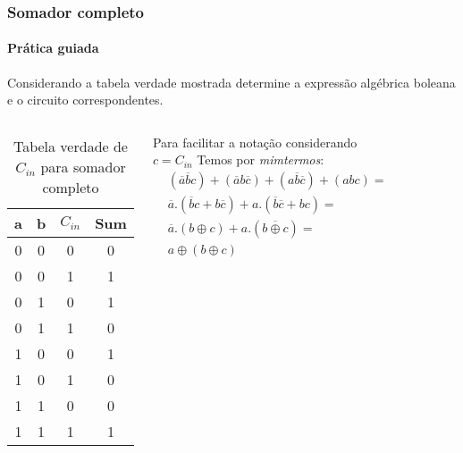 \begin{frame}
	\frametitle{Somador completo}
	\framesubtitle{\textbf{Prática guiada}}
	\par Considerando a tabela verdade mostrada determine a expressão algébrica boleana e o circuito correspondentes.
	\begin{columns}
			\begin{table}[h!]
				\centering
				\begin{tabular}{|c|c|c|c|}
					\hline
					a & b & $C_{in}$ & Sum \\
					\hline
					0 & 0 & 0 & 0 \\
					0 & 0 & 1 & 1 \\
					0 & 1 & 0 & 1 \\
					0 & 1 & 1 & 0 \\
					1 & 0 & 0 & 1 \\
					1 & 0 & 1 & 0 \\
					1 & 1 & 0 & 0 \\
					1 & 1 & 1 & 1 \\
					\hline
				\end{tabular}
				\caption{Tabela verdade de $C_{in}$ para somador completo}
				\label{tab:full_adder2}
			\end{table}
			\pause
			\par Para facilitar a notação considerando $c=C_{in}$ Temos por \textit{mimtermos}:
			\begin{equation}
				\begin{aligned}
					&(\overline{a}\overline{b}c)+(\overline{a}b\overline{c})+(a\overline{b}\overline{c})+(abc) = \\
					&\overline{a}.(\overline{b}c+b\overline{c}) + a.(\overline{b}\overline{c}+bc) = \\
					&\overline{a}.(b \oplus c) + a.(\overline{b \oplus c}) = \\
					& \boxed{a \oplus (b \oplus c)}
				\end{aligned}
			\end{equation}
			\pause
			\begin{figure}
				\centering
				
				\label{fig:somadorcompletoparte01}
			\end{figure}
	\end{columns}
\end{frame}
